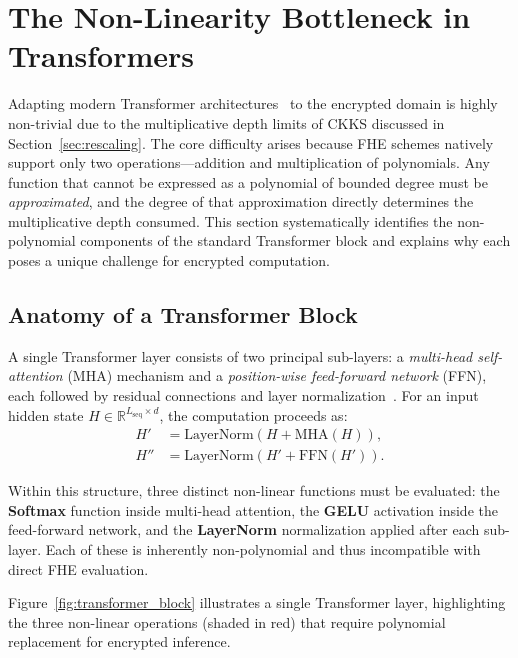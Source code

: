 \section{The Non-Linearity Bottleneck in Transformers}
\label{sec:nonlinearity_bottleneck}

Adapting modern Transformer architectures~\cite{vaswani2023attentionneed} to the encrypted domain is highly non-trivial due to the multiplicative depth limits of CKKS discussed in Section~\ref{sec:rescaling}. The core difficulty arises because FHE schemes natively support only two operations---addition and multiplication of polynomials. Any function that cannot be expressed as a polynomial of bounded degree must be \emph{approximated}, and the degree of that approximation directly determines the multiplicative depth consumed. This section systematically identifies the non-polynomial components of the standard Transformer block and explains why each poses a unique challenge for encrypted computation.

\subsection{Anatomy of a Transformer Block}

A single Transformer layer consists of two principal sub-layers: a \emph{multi-head self-attention} (MHA) mechanism and a \emph{position-wise feed-forward network} (FFN), each followed by residual connections and layer normalization~\cite{vaswani2023attentionneed}. For an input hidden state $H \in \mathbb{R}^{L_{\text{seq}} \times d}$, the computation proceeds as:
\begin{align}
    H' &= \mathrm{LayerNorm}\!\left(H + \mathrm{MHA}(H)\right), \label{eq:transformer_attn} \\
    H'' &= \mathrm{LayerNorm}\!\left(H' + \mathrm{FFN}(H')\right). \label{eq:transformer_ffn}
\end{align}

Within this structure, three distinct non-linear functions must be evaluated: the \textbf{Softmax} function inside multi-head attention, the \textbf{GELU} activation inside the feed-forward network, and the \textbf{LayerNorm} normalization applied after each sub-layer. Each of these is inherently non-polynomial and thus incompatible with direct FHE evaluation.

Figure~\ref{fig:transformer_block} illustrates a single Transformer layer, highlighting the three non-linear operations (shaded in red) that require polynomial replacement for encrypted inference.

